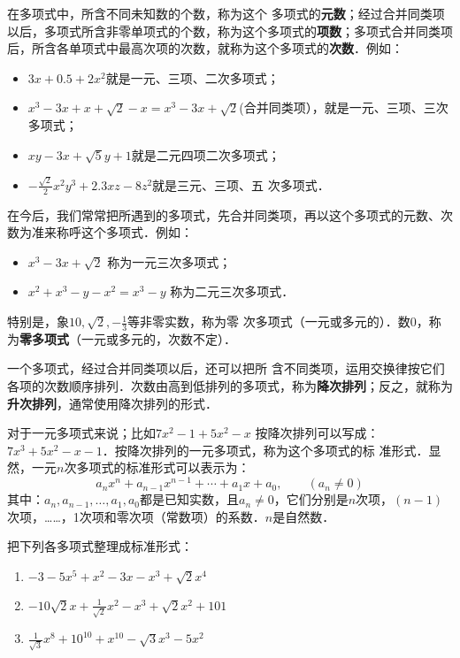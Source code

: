 在多项式中，所含不同未知数的个数，称为这个
多项式的\textbf{元数}；经过合并同类项以后，多项式所含非零单项式的个数，称为这个多项式的\textbf{项数}；多项式合并同类项后，所含各单项式中最高次项的次数，就称为这个多项式的\textbf{次数}．例如：
\begin{itemize}
    \item $3x+0.5+2x^2$就是一元、三项、二次多项式；
    \item $x^3-3x+x+\sqrt{2}-x=x^3-3x+\sqrt{2}$(合并同类项），就是一元、三项、三次多项式；
    \item $xy-3x+\sqrt{5}y+1$就是二元四项二次多项式；
    \item $-\frac{\sqrt{2}}{2}x^2y^3 +2.3xz-8z^2$就是三元、三项、五
次多项式．
\end{itemize}

在今后，我们常常把所遇到的多项式，先合并同类项，再以这个多项式的元数、次数为准来称呼这个多项式．例如：
\begin{itemize}
    \item $x^3-3x+\sqrt{2}$ 称为一元三次多项式；
    \item $x^2+x^3-y-x^2=x^3-y$ 称为二元三次多项式．
\end{itemize}
特别是，象$10,\sqrt{2},-\frac{1}{3}$等非零实数，称为零
次多项式（一元或多元的）．数0，称为\textbf{零多项式}（一元或多元的，次数不定）．

一个多项式，经过合并同类项以后，还可以把所
含不同类项，运用交换律按它们各项的次数顺序排列．次数由高到低排列的多项式，称为\textbf{降次排列}；反之，就称为\textbf{升次排列}，通常使用降次排列的形式．

对于一元多项式来说；比如$7x^2-1+5x^2-x$ 按降次排列可以写成：
$7x^3+5x^2-x-1$．按降次排列的一元多项式，称为这个多项式的标
准形式．显然，一元$n$次多项式的标准形式可以表示为：
\[a_nx^n+a_{n-1}x^{n-1}+\cdots +a_1x+a_0,\qquad (a_n\ne 0) \]
其中：$a_n,a_{n-1},\ldots,a_1,a_0$都是已知实数，且$a_n\ne 0$，它们分别是$n$次项，$(n-1)$次项，……，1次项和零次项（常数项）的系数．$n$是自然数．

\begin{example}
    把下列各多项式整理成标准形式：
    \begin{enumerate}
        \item $-3-5x^5+x^2-3x-x^3+\sqrt{2}x^4$
        \item $-10\sqrt{2}x+\frac{1}{\sqrt{2}}x^2-x^3+\sqrt{2}x^2+101$
        \item $\frac{1}{\sqrt{3}}x^8+10^{10}+x^{10}-\sqrt{3}x^3-5x^2$
    \end{enumerate}
\end{example}

